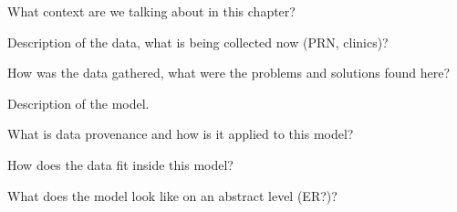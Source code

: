 What context are we talking about in this chapter?

Description of the data, what is being collected now (PRN, clinics)?

How was the data gathered, what were the problems and solutions found here?

Description of the model.

What is data provenance and how is it applied to this model?

How does the data fit inside this model?

What does the model look like on an abstract level (ER?)?